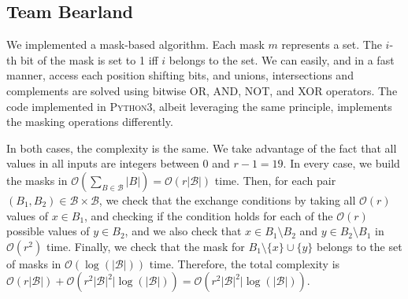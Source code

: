 \documentclass[11pt]{amsart}
\begin{document}
\subsection{Team Bearland}

We implemented a mask-based algorithm.
Each mask $m$ represents a set.
The $i$-th bit of the mask is set to 1 iff $i$ belongs to the set.
We can easily, and in a fast manner, access each position shifting bits, and unions, intersections and complements are solved using bitwise OR, AND, NOT, and XOR operators.
The code implemented in \textsc{Python3}, albeit leveraging the same principle, implements the masking operations differently.
 
In both cases, the complexity is the same. We take advantage of the fact that all values in all inputs are integers between $0$ and $r - 1 = 19$. In every case, we build the masks in $\mathcal{O}(\sum_{B \in \mathcal{B}} |B|) = \mathcal{O}(r|\mathcal{B}|)$ time. Then, for each pair $(B_1, B_2) \in \mathcal{B} \times \mathcal{B}$, we check that the exchange conditions by taking all $\mathcal{O}(r)$ values of $x \in B_1$, and checking if the condition holds for each of the $\mathcal{O}(r)$ possible values of $y \in B_2$, and we also check that $x \in B_1 \setminus B_2$ and $y \in B_2 \setminus B_1$ in $\mathcal{O}(r^2)$ time. Finally, we check that the mask for $B_1 \setminus \{x\} \cup \{y\}$ belongs to the set of masks in $\mathcal{O}(\log(|\mathcal{B}|))$ time. Therefore, the total complexity is $\mathcal{O}(r |\mathcal{B}|) + \mathcal{O}(r^2 |\mathcal{B}|^2| \log(|\mathcal{B}|)) =  \mathcal{O}(r^2 |\mathcal{B}|^2| \log(|\mathcal{B}|))$.
\end{document}
